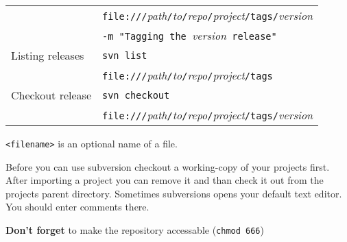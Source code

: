 \begin{tabular}{@{}p{\the\MyLen}%
				@{}p{\linewidth-\the\MyLen}}
								& \verb!file:///!\textit{path}\verb!/!\textit{to}\verb!/!\textit{repo}\verb!/!\textit{project}\verb!/tags/!\textit{version} \\
								& \verb!-m "Tagging the !\textit{version}\verb! release"!\\
	Listing releases			& \verb!svn list !\\
								& \verb!file:///!\textit{path}\verb!/!\textit{to}\verb!/!\textit{repo}\verb!/!\textit{project}\verb!/tags!\\
	Checkout release			& \verb!svn checkout !\\
								& \verb!file:///!\textit{path}\verb!/!\textit{to}\verb!/!\textit{repo}\verb!/!\textit{project}\verb!/tags/!\textit{version}\\
\end{tabular}

\verb!<filename>! is an optional name of a file.

Before you can use subversion checkout a working-copy of your projects first. After importing a project you can remove it and than check it out from the projects parent directory.
Sometimes subversions opens your default text editor. You should enter comments there.

\textbf{Don't forget} to make the repository accessable (\verb!chmod 666!)

